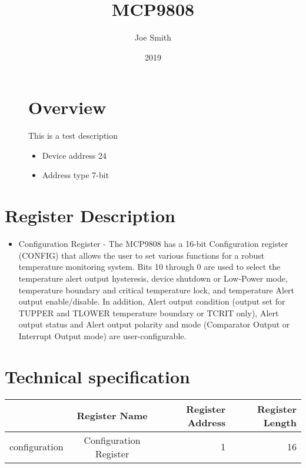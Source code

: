 \documentclass[a4paper,12pt,oneside,pdflatex,italian,final,twocolumn]{article}
\title{ MCP9808 }
\author{ Joe Smith }
\date{ 2019 }
\begin{document}
\pagestyle{fancy}



\onecolumn


\begin{figure}
\begin{minipage}{0.47\textwidth}

\section{Overview}
    This is a test description
    \begin{itemize}
        \item Device address 24
        \item Address type 7-bit
    \end{itemize}


\end{minipage}
\hfill

\end{figure}


\section{Register Description}
\begin{itemize}
\item Configuration Register - The MCP9808 has a 16-bit Configuration register (CONFIG) that
allows the user to set various functions for a robust temperature
monitoring system.
Bits 10 through 0 are used to select the temperature alert output
hysteresis, device shutdown or Low-Power mode, temperature boundary
and critical temperature lock, and temperature Alert output
enable/disable.
In addition, Alert output condition (output set for TUPPER and
TLOWER temperature boundary or TCRIT only), Alert output status
and Alert output polarity and mode (Comparator Output or Interrupt
Output mode) are user-configurable.

\end{itemize}

\section{Technical specification}
\centering
\begin{tabular}{lcrr}
\toprule
 & Register Name & Register Address & Register Length \\
\midrule
configuration & Configuration Register & 1 & 16 \\
\bottomrule
\end{tabular}
\end{document}
